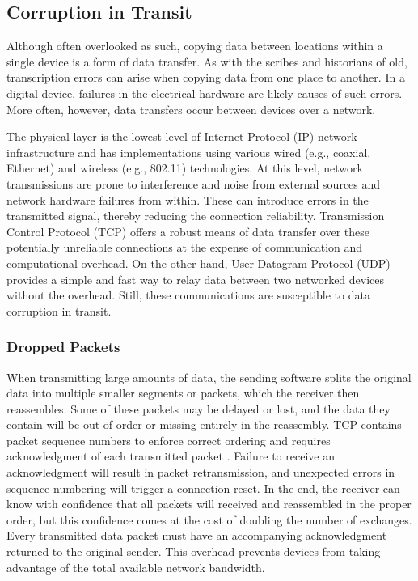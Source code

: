 \subsection{Corruption in Transit}

Although often overlooked as such, copying data between locations within a single device is a form of data transfer. As with the scribes and historians of old, transcription errors can arise when copying data from one place to another. In a digital device, failures in the electrical hardware are likely causes of such errors. More often, however, data transfers occur between devices over a network.

The physical layer is the lowest level of Internet Protocol (IP) network infrastructure and has implementations using various wired (e.g., coaxial, Ethernet) and wireless (e.g., 802.11) technologies. At this level, network transmissions are prone to interference and noise from external sources and network hardware failures from within. These can introduce errors in the transmitted signal, thereby reducing the connection reliability. Transmission Control Protocol (TCP) offers a robust means of data transfer over these potentially unreliable connections at the expense of communication and computational overhead. On the other hand, User Datagram Protocol (UDP) provides a simple and fast way to relay data between two networked devices without the overhead. Still, these communications are susceptible to data corruption in transit.

\subsubsection{Dropped Packets}

When transmitting large amounts of data, the sending software splits the original data into multiple smaller segments or packets, which the receiver then reassembles. Some of these packets may be delayed or lost, and the data they contain will be out of order or missing entirely in the reassembly. TCP contains packet sequence numbers to enforce correct ordering and requires acknowledgment of each transmitted packet \cite{cerf1974}. Failure to receive an acknowledgment will result in packet retransmission, and unexpected errors in sequence numbering will trigger a connection reset. In the end, the receiver can know with confidence that all packets will received and reassembled in the proper order, but this confidence comes at the cost of doubling the number of exchanges. Every transmitted data packet must have an accompanying acknowledgment returned to the original sender. This overhead prevents devices from taking advantage of the total available network bandwidth.

